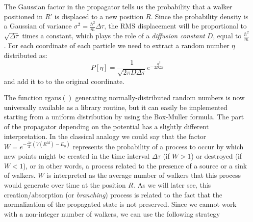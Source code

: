 The Gaussian factor in the propagator tells us the probability that a walker positioned in $R'$ is displaced to a new position $R$. Since the probability density is a Gaussian of variance
$\sigma^2=\frac{\hbar^2}{m}\Delta\tau$, the RMS displacement will be proportional to $\sqrt{\Delta\tau}$ times a constant, which plays the role of a {\it diffusion constant} $D$, equal to $\frac{\hbar^2}{m}$. For each coordinate of each particle we need to extract a random number
$\eta$ distributed as:
\begin{equation}
\label{eq:gaussprop}
P[\eta]=\frac{1}{\sqrt{2\pi D \Delta\tau}}e^{-\frac{\eta^2}{2D\Delta\tau}}
\end{equation}
and add it to to the original coordinate. 
\begin{svgraybox}
	\begin{algorithmic} 
		\EndFor
		\EndFor
	\end{algorithmic}
\end{svgraybox}
The function $\text{rgaus}()$ generating normally-distributed random numbers is now universally available as a library routine, but it can easily be implemented starting from a uniform distribution by using the Box-Muller formula. 
The part of the propagator depending on the potential has a slightly different interpretation. In the classical analogy we could say that the factor $W=e^{-\frac{\Delta\tau}{2}(V(R^M)-E_0)}$ represents 
the probability of a process to occur by which new points might be created in the time interval $\Delta\tau$ (if $W>1$) or destroyed (if $W<1$), or in other words, a process related to the presence of a source or a sink of walkers. $W$ is interpreted as the average number of walkers that this
process would generate over time at the position $R$. As we will later see, this creation/absorption (or {\it branching}) process is related to the fact that the normalization of the propagated state is not preserved.
Since we cannot work with a non-integer number of walkers, we can use the following strategy
